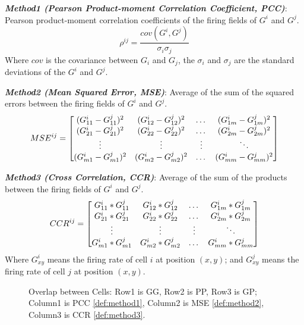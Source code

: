 \documentclass[11pt, letterpaper, onecolumn]{article}
\begin{document}
\textbf{\textit{Method1 (Pearson Product-moment Correlation Coefficient, PCC)}}: Pearson product-moment correlation coefficients of the firing fields of $G^i$ and $G^j$. 
\begin{equation}
\label{def:method1}
    \rho ^{ij} = \frac{cov(G^{i}, G^{j})}{\sigma_{i} \sigma_{j}}
\end{equation}
Where $cov$ is the covariance between $G_{i}$ and $G_{j}$, the $\sigma_{i}$ and $\sigma_{j}$ are the standard deviations of the $G^{i}$ and $G^{j}$.

\textbf{\textit{Method2 (Mean Squared Error, MSE)}}: Average of the sum of the squared errors between the firing fields of $G^i$ and $G^j$.
\begin{equation}
\label{def:method2}
    MSE^{ij} \\
    =  
\begin{bmatrix}
    (G^{i}_{11}-G^{j}_{11})^2 & (G^{i}_{12}-G^{j}_{12})^2 & \dots  & (G^{i}_{1m}-G^{j}_{1m})^2 \\
    (G^{i}_{21}-G^{j}_{21})^2 & (G^{i}_{22}-G^{j}_{22})^2 & \dots  & (G^{i}_{2m}-G^{j}_{2m})^2 \\
    \vdots & \vdots & \vdots & \ddots \\
    (G^{i}_{m1}-G^{j}_{m1})^2 & (G^{i}_{m2}-G^{j}_{m2})^2 & \dots  & (G^{i}_{mm}-G^{j}_{mm})^2 
\end{bmatrix} 
\end{equation}

\textbf{\textit{Method3 (Cross Correlation, CCR)}}: Average of the sum of the products between the firing fields of $G^i$ and $G^j$.
\begin{equation}
\label{def:method3}
    CCR^{ij} \\
    = 
\begin{bmatrix}
    G^{i}_{11}*G^{j}_{11} & G^{i}_{12}*G^{j}_{12} & \dots  & G^{i}_{1m}*G^{j}_{1m} \\
    G^{i}_{21}*G^{j}_{21} & G^{i}_{22}*G^{j}_{22} & \dots  & G^{i}_{2m}*G^{j}_{2m} \\
    \vdots & \vdots & \vdots & \ddots \\
    G^{i}_{m1}*G^{j}_{m1} & G^{i}_{m2}*G^{j}_{m2} & \dots  & G^{i}_{mm}*G^{j}_{mm} 
\end{bmatrix}
\end{equation}
Where $G^{i}_{xy}$ means the firing rate of cell $i$ at position $(x,y)$; and $G^{j}_{xy}$ means the firing rate of cell $j$ at position $(x,y)$.

\begin{figure}[!htbp]
\centering
{}
\caption{Overlap between Cells: Row1 is GG, Row2 is PP, Row3 is GP; Column1 is PCC \ref{def:method1}, Column2 is MSE \ref{def:method2}, Column3 is CCR \ref{def:method3}.}
\label{fig:overlap}
\end{figure}
\end{document}

